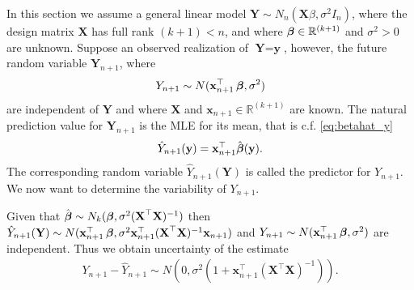 In this section we assume a general linear model $\textbf{Y}\sim N_n(\textbf{X}\beta, \sigma^2 I_n)$, where the design matrix $\textbf{X}$ has full rank $(k+1)<n$, and where $\operatorname{\boldsymbol{\beta}} \in \mathbb{R}^{(k+1)}$ and $\sigma^2>0$ are unknown. Suppose an observed realization of $\textbf{Y}=\textbf{y}$, however, the future random variable $\textbf{Y}_{n+1}$, where
\begin{align*}
    Y_{n+1}\sim N(\textbf{x}^\top_{n+1}\operatorname{\boldsymbol{\beta}},\sigma^2)
\end{align*}
are independent of $\textbf{Y}$ and where $\textbf{X}$ and $\textbf{x}_{n+1}\in\mathbb{R}^{(k+1)}$ are known. 
The natural prediction value for $\textbf{Y}_{n+1}$ is the MLE for its mean, that is c.f. \eqref{eq:betahat_y}
\begin{align*}
    \hat{Y}_{n+1}(\textbf{y})=\textbf{x}^\top_{n+1}\hat{\operatorname{\boldsymbol{\beta}}}(\textbf{y}).
\end{align*}
The corresponding random variable $\hat{Y}_{n+1}(\textbf{Y})$ is called the predictor for $Y_{n+1}$. 
We now want to determine the variability of $Y_{n+1}$.

Given that $\hat{\operatorname{\boldsymbol{\beta}}} \sim N_k(\operatorname{\boldsymbol{\beta}},\sigma^2(\textbf{X}^\top\textbf{X})^{-1})$ then $\hat{Y}_{n+1}(\textbf{Y})\sim N(\textbf{x}^\top_{n+1}\operatorname{\boldsymbol{\beta}},\sigma^2\textbf{x}^\top_{n+1}(\textbf{X}^\top\textbf{X})^{-1}\textbf{x}_{n+1})$ and $Y_{n+1}\sim N(\textbf{x}^\top_{n+1}\operatorname{\boldsymbol{\beta}},\sigma^2)$ are independent. Thus we obtain uncertainty of the estimate
\begin{align*}
    Y_{n+1}-\hat{Y}_{n+1} \sim N(0, \sigma^2(1+\textbf{x}^\top_{n+1}(\textbf{X}^\top\textbf{X})^{-1})).
\end{align*}

